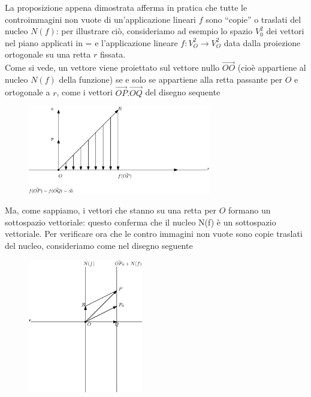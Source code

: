 La proposizione appena dimostrata afferma in pratica che tutte le controimmagini non vuote
di un'applicazione lineari $f$ sono ``copie'' o traslati del nucleo $N(f)$: per illustrare ciò,
consideriamo ad esempio lo spazio $V_0^2$ dei vettori nel piano applicati in = e l'applicazione
lineare $f:V^2_O \to V^2_O$ data dalla proiezione ortogonale su una retta $r$ fissata.\\
Come si vede, un vettore viene proiettato sul vettore nullo $\vec{OO}$ (cioè appartiene al
nucleo $N(f)$ della funzione) se e solo se appartiene alla retta passante per $O$ e ortogonale
a $r$, come i vettori $\vec{OP}. \vec{OQ}$ del disegno sequente
\begin{figure}[th]
  \centering
  \includegraphics[width=8cm]{img/finiti/imgex4-4-5.eps}
\end{figure}

Ma, come sappiamo, i vettori che stanno su una retta per $O$ formano un sottospazio vettoriale:
questo conferma che il nucleo N(f) è un sottospazio vettoriale.
Per verificare ora che le contro immagini non vuote sono copie traslati del nucleo, consideriamo
come nel disegno seguente
\begin{figure}[th]
  \centering
  \includegraphics[width=5cm]{img/finiti/imgex4-4-6.eps}
\end{figure}

